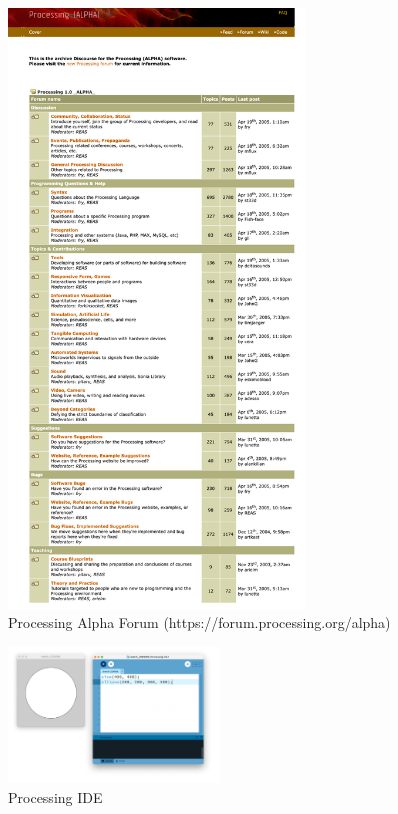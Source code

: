\documentclass[draft]{article}
\begin{document}
\begin{figure}
  \centering
  \includegraphics[width=0.7\textwidth]{images/processing_alpha_forum_screenshot.png} 
  \caption{Processing Alpha Forum (https://forum.processing.org/alpha)}
  \label{fig:alpha_forum_screenshot}
\end{figure}

\begin{figure}
  \includegraphics[width=0.5\textwidth]{images/processing_ide.png} 
  \caption{Processing IDE \parencite{reasProcessingIDE2015}}
  \label{fig:processing_ide_screenshot}
\end{figure}
\end{document}
